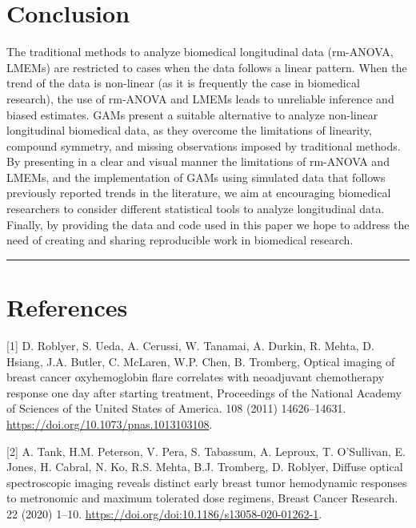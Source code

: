 \documentclass[
]{article}
\begin{document}
\FloatBarrier

\hypertarget{conclusion}{%
\section{Conclusion}\label{conclusion}}

The traditional methods to analyze biomedical longitudinal data (rm-ANOVA, LMEMs) are restricted to cases when the data follows a linear pattern. When the trend of the data is non-linear (as it is frequently the case in biomedical research), the use of rm-ANOVA and LMEMs leads to unreliable inference and biased estimates. GAMs present a suitable alternative to analyze non-linear longitudinal biomedical data, as they overcome the limitations of linearity, compound symmetry, and missing observations imposed by traditional methods. By presenting in a clear and visual manner the limitations of rm-ANOVA and LMEMs, and the implementation of GAMs using simulated data that follows previously reported trends in the literature, we aim at encouraging biomedical researchers to consider different statistical tools to analyze longitudinal data. Finally, by providing the data and code used in this paper we hope to address the need of creating and sharing reproducible work in biomedical research.

\FloatBarrier

\begin{center}\rule{0.5\linewidth}{0.5pt}\end{center}

\newpage

\hypertarget{references}{%
\section{References}\label{references}}

\hypertarget{refs}{}
\leavevmode\hypertarget{ref-roblyer2011}{}%
{[}1{]} D. Roblyer, S. Ueda, A. Cerussi, W. Tanamai, A. Durkin, R. Mehta, D. Hsiang, J.A. Butler, C. McLaren, W.P. Chen, B. Tromberg, Optical imaging of breast cancer oxyhemoglobin flare correlates with neoadjuvant chemotherapy response one day after starting treatment, Proceedings of the National Academy of Sciences of the United States of America. 108 (2011) 14626--14631. \url{https://doi.org/10.1073/pnas.1013103108}.

\leavevmode\hypertarget{ref-tank2020}{}%
{[}2{]} A. Tank, H.M. Peterson, V. Pera, S. Tabassum, A. Leproux, T. O'Sullivan, E. Jones, H. Cabral, N. Ko, R.S. Mehta, B.J. Tromberg, D. Roblyer, Diffuse optical spectroscopic imaging reveals distinct early breast tumor hemodynamic responses to metronomic and maximum tolerated dose regimens, Breast Cancer Research. 22 (2020) 1--10. \url{https://doi.org/doi:10.1186/s13058-020-01262-1}.
\end{document}
